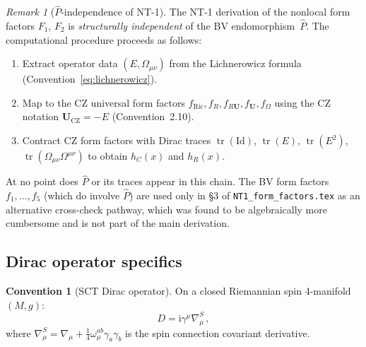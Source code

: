 \documentclass[12pt,a4paper]{article}
\theoremstyle{definition}
\newtheorem{convention}[proposition]{Convention}
\theoremstyle{remark}
\newtheorem{remark}[proposition]{Remark}
\newcommand{\tr}{\operatorname{tr}}
\newcommand{\ii}{\mathrm{i}}
\newcommand{\Id}{\mathrm{Id}}
\begin{document}
\begin{remark}[$\hat{P}$-independence of NT-1]
\label{rem:Phat-independence}
The NT-1 derivation of the nonlocal form factors $F_1$, $F_2$
is \emph{structurally independent} of the BV endomorphism~$\hat{P}$.
The computational procedure proceeds as follows:
\begin{enumerate}[nosep]
  \item Extract operator data $(E, \Omega_{\mu\nu})$ from the
        Lichnerowicz formula (Convention~\ref{eq:lichnerowicz}).
  \item Map to the CZ universal form factors
        $f_{\mathrm{Ric}}, f_R, f_{R\mathbf{U}}, f_\mathbf{U}, f_\Omega$
        using the CZ notation
        $\mathbf{U}_{\mathrm{CZ}} = -E$ (Convention~2.10).
  \item Contract CZ form factors with Dirac traces
        $\tr(\Id)$, $\tr(E)$, $\tr(E^2)$,
        $\tr(\Omega_{\mu\nu}\Omega^{\mu\nu})$
        to obtain $h_C(x)$ and $h_R(x)$.
\end{enumerate}
At no point does $\hat{P}$ or its traces appear in this chain.
The BV form factors $f_1,\dots,f_5$ (which do involve $\hat{P}$)
are used only in \S3 of \texttt{NT1\_form\_factors.tex} as an
alternative cross-check pathway, which was found to be algebraically
more cumbersome and is not part of the main derivation.
\end{remark}


\subsection{Dirac operator specifics}

\begin{convention}[SCT Dirac operator]
On a closed Riemannian spin 4-manifold $(M,g)$:
\begin{equation}
  D = \ii\gamma^\mu\nabla^S_\mu\,,
  \label{eq:dirac}
\end{equation}
where $\nabla^S_\mu = \nabla_\mu + \frac{1}{4}\omega_\mu^{ab}\gamma_a\gamma_b$
is the spin connection covariant derivative.
\end{convention}
\end{document}
